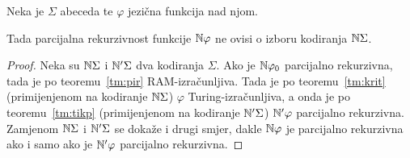 \begin{korolar}[{name=[neovisnost izračunljivosti jezične funkcije o kodiranju abecede]}]\label{kor:ikojiNSigma}
Neka je $\Sigma$ abeceda te $\varphi$ jezična funkcija nad njom.

	Tada parcijalna rekurzivnost funkcije ${\mathbb N}\varphi$ ne ovisi o izboru kodiranja ${\mathbb N}\Sigma$.
\end{korolar}
\begin{proof}
Neka su ${\mathbb N}\Sigma$ i ${\mathbb N}'\Sigma$ dva kodiranja $\Sigma$. Ako je ${\mathbb N}\varphi_0$ parcijalno rekurzivna, tada je po teoremu~\ref{tm:pir} RAM-izračunljiva. Tada je po teoremu~\ref{tm:krit} (primijenjenom na kodiranje ${\mathbb N}\Sigma$) $\varphi$ Turing-izračunljiva, a onda je po teoremu~\ref{tm:tikp} (primijenjenom na kodiranje ${\mathbb N}'\Sigma$) ${\mathbb N}'\varphi$ parcijalno rekurzivna. Zamjenom ${\mathbb N}\Sigma$ i ${\mathbb N}'\Sigma$ se dokaže i drugi smjer, dakle ${\mathbb N}\varphi$ je parcijalno rekurzivna ako i samo ako je ${\mathbb N}'\varphi$ parcijalno rekurzivna.
\end{proof}


